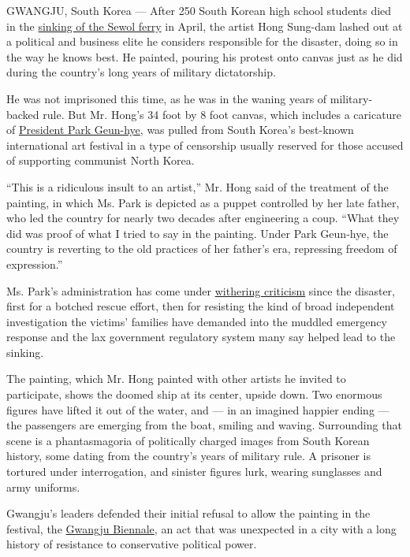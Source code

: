 GWANGJU, South Korea --- After 250 South Korean high school students
died in the
\href{http://www.nytimes.com/2014/04/17/world/asia/south-korean-ferry-accident.html}{sinking
of the Sewol ferry} in April, the artist Hong Sung-dam lashed out at a
political and business elite he considers responsible for the disaster,
doing so in the way he knows best. He painted, pouring his protest onto
canvas just as he did during the country's long years of military
dictatorship.

He was not imprisoned this time, as he was in the waning years of
military-backed rule. But Mr. Hong's 34 foot by 8 foot canvas, which
includes a caricature of
\href{http://topics.nytimes.com/top/reference/timestopics/people/p/park_geunhye/index.html}{President
Park Geun-hye}, was pulled from South Korea's best-known international
art festival in a type of censorship usually reserved for those accused
of supporting communist North Korea.

``This is a ridiculous insult to an artist,'' Mr. Hong said of the
treatment of the painting, in which Ms. Park is depicted as a puppet
controlled by her late father, who led the country for nearly two
decades after engineering a coup. ``What they did was proof of what I
tried to say in the painting. Under Park Geun-hye, the country is
reverting to the old practices of her father's era, repressing freedom
of expression.''

Ms. Park's administration has come under
\href{http://www.nytimes.com/2014/04/30/world/asia/south-korea-ferry-disaster.html}{withering
criticism} since the disaster, first for a botched rescue effort, then
for resisting the kind of broad independent investigation the victims'
families have demanded into the muddled emergency response and the lax
government regulatory system many say helped lead to the sinking.

The painting, which Mr. Hong painted with other artists he invited to
participate, shows the doomed ship at its center, upside down. Two
enormous figures have lifted it out of the water, and --- in an imagined
happier ending --- the passengers are emerging from the boat, smiling
and waving. Surrounding that scene is a phantasmagoria of politically
charged images from South Korean history, some dating from the country's
years of military rule. A prisoner is tortured under interrogation, and
sinister figures lurk, wearing sunglasses and army uniforms.

Gwangju's leaders defended their initial refusal to allow the painting
in the festival, the \href{http://www.gwangjubiennale.org/eng/}{Gwangju
Biennale}, an act that was unexpected in a city with a long history of
resistance to conservative political power.

